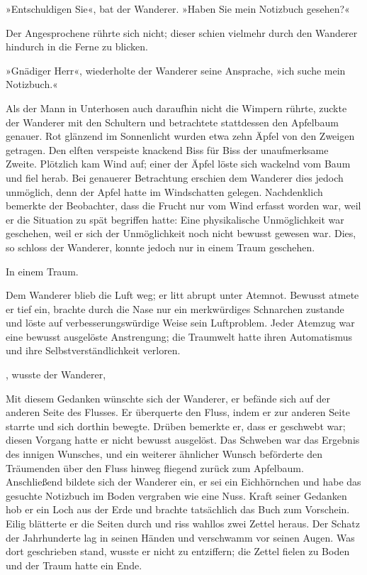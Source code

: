 »Entschuldigen Sie«, bat der Wanderer. »Haben Sie mein Notizbuch gesehen?«

Der Angesprochene rührte sich nicht; dieser schien vielmehr durch den Wanderer hindurch in die Ferne zu blicken.

»Gnädiger Herr«, wiederholte der Wanderer seine Ansprache, »ich suche mein Notizbuch.«

Als der Mann in Unterhosen auch daraufhin nicht die Wimpern rührte, zuckte der Wanderer mit den Schultern und betrachtete stattdessen den Apfelbaum genauer. Rot glänzend im Sonnenlicht wurden etwa zehn Äpfel von den Zweigen getragen. Den elften verspeiste knackend Biss für Biss der unaufmerksame Zweite. Plötzlich kam Wind auf; einer der Äpfel löste sich wackelnd vom Baum und fiel herab. Bei genauerer Betrachtung erschien dem Wanderer dies jedoch unmöglich, denn der Apfel hatte im Windschatten gelegen. Nachdenklich bemerkte der Beobachter, dass die Frucht nur vom Wind erfasst worden war, weil er die Situation zu spät begriffen hatte: Eine physikalische Unmöglichkeit war geschehen, weil er sich der Unmöglichkeit noch nicht bewusst gewesen war. Dies, so schloss der Wanderer, konnte jedoch nur in einem Traum geschehen.

In einem Traum.

Dem Wanderer blieb die Luft weg; er litt abrupt unter Atemnot. Bewusst atmete er tief ein, brachte durch die Nase nur ein merkwürdiges Schnarchen zustande und löste auf verbesserungswürdige Weise sein Luftproblem. Jeder Atemzug war eine bewusst ausgelöste Anstrengung; die Traumwelt hatte ihren Automatismus und ihre Selbstverständlichkeit verloren.

, wusste der Wanderer, 

Mit diesem Gedanken wünschte sich der Wanderer, er befände sich auf der anderen Seite des Flusses. Er überquerte den Fluss, indem er zur anderen Seite starrte und sich dorthin bewegte. Drüben bemerkte er, dass er geschwebt war; diesen Vorgang hatte er nicht bewusst ausgelöst. Das Schweben war das Ergebnis des innigen Wunsches, und ein weiterer ähnlicher Wunsch beförderte den Träumenden über den Fluss hinweg fliegend zurück zum Apfelbaum. Anschließend bildete sich der Wanderer ein, er sei ein Eichhörnchen und habe das gesuchte Notizbuch im Boden vergraben wie eine Nuss. Kraft seiner Gedanken hob er ein Loch aus der Erde und brachte tatsächlich das Buch zum Vorschein. Eilig blätterte er die Seiten durch und riss wahllos zwei Zettel heraus. Der Schatz der Jahrhunderte lag in seinen Händen und verschwamm vor seinen Augen. Was dort geschrieben stand, wusste er nicht zu entziffern; die Zettel fielen zu Boden und der Traum hatte ein Ende.

